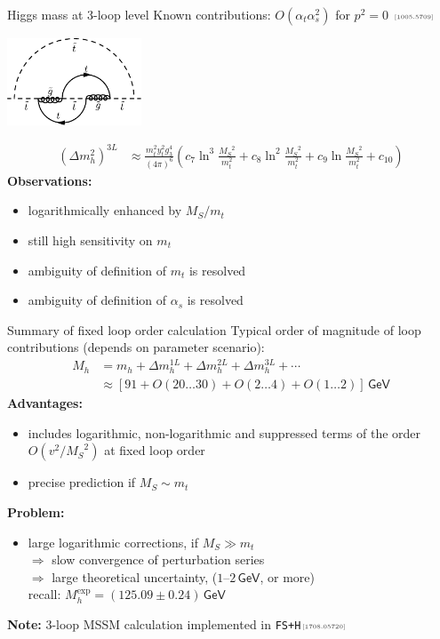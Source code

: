 \documentclass[hyperref={pdfpagelabels=false},ngerman]{beamer}
\newcommand{\cmark}{\ding{51}}%
\newcommand{\eh}[1]{\,\mathsf{#1}}
\newcommand{\ok}{\textcolor{darkgreen}{\cmark}}
\newcommand{\MS}{\ensuremath{M_S}}
\newcommand{\mycite}[1]{\ensuremath{\text{\textcolor{darkgray}{\tiny [#1]}}}}
\renewcommand{\emph}{\textbf}
\newcommand{\fsh}{\texttt{FS+H}\xspace}
\newcommand{\at}{\alpha_t}
\newcommand{\as}{\alpha_s}
\begin{document}
\begin{frame}{Higgs mass at 3-loop level}
  Known contributions: $O(\at\as^2)$ for $p^2 = 0$ \mycite{1005.5709}
  \begin{center}
    \includegraphics[width=0.3\textwidth]{images/h3l-atasas}
  \end{center}
  \begin{align*}
    (\Delta m_h^2)^{3L} &\approx
    \frac{m_t^2 y_t^2 g_3^4}{(4\pi)^6} \left(
      c_7 \ln^3\frac{\MS^2}{m_t^2}
      + c_8 \ln^2\frac{\MS^2}{m_t^2}
      + c_9 \ln\frac{\MS^2}{m_t^2}
      + c_{10}
    \right)
  \end{align*}
  \emph{Observations:}
  \begin{itemize}
  \item logarithmically enhanced by $\MS / m_t$
  \item still high sensitivity on $m_t$
  \item ambiguity of definition of $m_t$ is resolved \ok
  \item ambiguity of definition of $\as$ is resolved \ok
  \end{itemize}
\end{frame}

\begin{frame}{Summary of fixed loop order calculation}
  Typical order of magnitude of loop contributions (depends on
  parameter scenario):
  \begin{align*}
    M_h &= m_h + \Delta m_h^{1L} + \Delta m_h^{2L} + \Delta m_h^{3L} + \cdots \\
    &\approx [91 + O(20\ldots 30) + O(2\ldots 4) + O(1\ldots 2)] \eh{GeV}
  \end{align*}
  \emph{Advantages:}
  \begin{itemize}
  \item includes logarithmic, non-logarithmic and suppressed terms of
    the order $O(v^2/\MS^2)$ at fixed loop order
  \item precise prediction if $\MS \sim m_t$
  \end{itemize}
  \emph{Problem:}
  \begin{itemize}
  \item large logarithmic corrections, if $\MS \gg m_t$ \\
    $\Rightarrow$ slow convergence of perturbation series \\
    $\Rightarrow$ large theoretical uncertainty, ($1$--$2\eh{GeV}$, or
    more) \\
    recall: $M_h^{\text{exp}} = (125.09 \pm 0.24)\eh{GeV}$
  \end{itemize}
  \emph{Note:} 3-loop MSSM calculation implemented in \fsh \mycite{1708.05720}
\end{frame}
\end{document}

